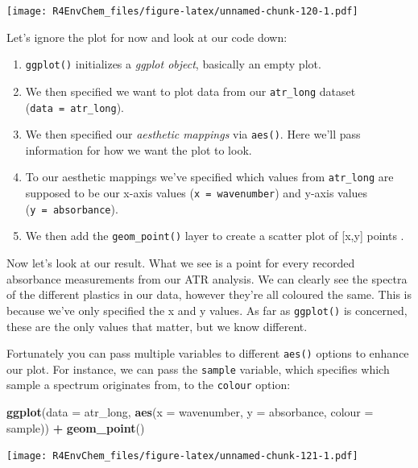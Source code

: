 \documentclass[
]{book}
\newenvironment{Shaded}{\begin{snugshade}}{\end{snugshade}}
\newcommand{\AttributeTok}[1]{\textcolor[rgb]{0.13,0.29,0.53}{#1}}
\newcommand{\FunctionTok}[1]{\textcolor[rgb]{0.13,0.29,0.53}{\textbf{#1}}}
\newcommand{\NormalTok}[1]{#1}
\newcommand{\SpecialCharTok}[1]{\textcolor[rgb]{0.81,0.36,0.00}{\textbf{#1}}}
\providecommand{\tightlist}{%
  \setlength{\itemsep}{0pt}\setlength{\parskip}{0pt}}
\begin{document}
\texttt{[image: R4EnvChem\_files/figure-latex/unnamed-chunk-120-1.pdf]}

Let's ignore the plot for now and look at our code down:

\begin{enumerate}
\def\labelenumi{\arabic{enumi}.}
\tightlist
\item
  \texttt{ggplot()} initializes a \emph{ggplot object}, basically an empty plot.
\item
  We then specified we want to plot data from our \texttt{atr\_long} dataset (\texttt{data\ =\ atr\_long}).
\item
  We then specified our \emph{aesthetic mappings} via \texttt{aes()}. Here we'll pass information for how we want the plot to look.
\item
  To our aesthetic mappings we've specified which values from \texttt{atr\_long} are supposed to be our x-axis values (\texttt{x\ =\ wavenumber}) and y-axis values (\texttt{y\ =\ absorbance}).
\item
  We then add the \texttt{geom\_point()} layer to create a scatter plot of {[}x,y{]} points .
\end{enumerate}

Now let's look at our result. What we see is a point for every recorded absorbance measurements from our ATR analysis. We can clearly see the spectra of the different plastics in our data, however they're all coloured the same. This is because we've only specified the x and y values. As far as \texttt{ggplot()} is concerned, these are the only values that matter, but we know different.

Fortunately you can pass multiple variables to different \texttt{aes()} options to enhance our plot. For instance, we can pass the \texttt{sample} variable, which specifies which sample a spectrum originates from, to the \texttt{colour} option:

\begin{Shaded}
\begin{Highlighting}[]
\FunctionTok{ggplot}\NormalTok{(}\AttributeTok{data =}\NormalTok{ atr\_long, }
       \FunctionTok{aes}\NormalTok{(}\AttributeTok{x =}\NormalTok{ wavenumber, }
           \AttributeTok{y =}\NormalTok{ absorbance, }
           \AttributeTok{colour =}\NormalTok{ sample)) }\SpecialCharTok{+}
  \FunctionTok{geom\_point}\NormalTok{()}
\end{Highlighting}
\end{Shaded}

\texttt{[image: R4EnvChem\_files/figure-latex/unnamed-chunk-121-1.pdf]}
\end{document}
